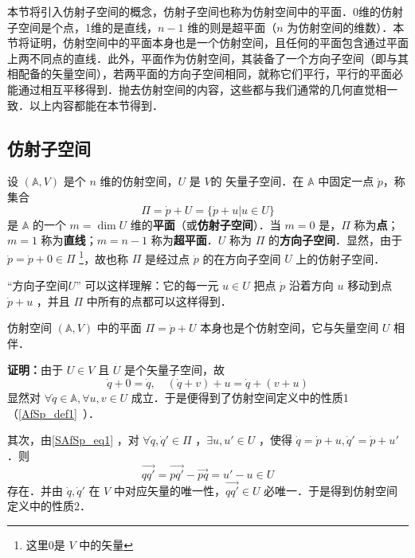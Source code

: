 
\begin{issues}
\end{issues}

本节将引入仿射子空间的概念，仿射子空间也称为仿射空间中的平面．0维的仿射子空间是个点，1维的是直线，$n-1$ 维的则是超平面（$n$ 为仿射空间的维数）．本节将证明，仿射空间中的平面本身也是一个仿射空间，且任何的平面包含通过平面上两不同点的直线．此外，平面作为仿射空间，其装备了一个方向子空间（即与其相配备的矢量空间），若两平面的方向子空间相同，就称它们平行，平行的平面必能通过相互平移得到．抛去仿射空间的内容，这些都与我们通常的几何直觉相一致．以上内容都能在本节得到．
\subsection{仿射子空间}
\begin{definition}{}\label{SAfSp_def1}
设 $(\mathbb A,V)$ 是个 $n$ 维的仿射空间，$U$ 是 $V$的 矢量子空间．在 $\mathbb A$ 中固定一点 $\dot p$，称集合
\begin{equation}\label{SAfSp_eq1}
\Pi=\dot p+U=\{\dot p+u|u\in U\}
\end{equation}
是 $\mathbb A$ 的一个 $m=\dim U$ 维的\textbf{平面}（或\textbf{仿射子空间}）．当 $m=0$ 是，$\Pi$ 称为\textbf{点}；$m=1$ 称为\textbf{直线}；$m=n-1$ 称为\textbf{超平面}．$U$ 称为 $\Pi$ 的\textbf{方向子空间}．显然，由于 $\dot p=\dot p+0\in \Pi$ \footnote{这里0是 $V$ 中的矢量}，故也称 $\Pi$ 是经过点 $\dot p$ 的在方向子空间 $U$ 上的仿射子空间．
\end{definition}
“方向子空间$U$” 可以这样理解：它的每一元 $u\in U$ 把点 $\dot p$ 沿着方向 $u$ 移动到点 $\dot p+u$ ，并且 $\Pi$ 中所有的点都可以这样得到．

\begin{theorem}{}
仿射空间 $(\mathbb A,V)$ 中的平面 $\Pi=\dot p+U$ 本身也是个仿射空间，它与矢量空间 $U$ 相伴．
\end{theorem}
\textbf{证明：}由于 $U\in V$ 且 $U$ 是个矢量子空间，故
\begin{equation}
\dot q+0=\dot q,\quad (\dot q+v)+u=\dot q+(v+u)
\end{equation}
显然对 $\forall \dot q\in\mathbb A,\forall u,v\in U$ 成立．于是便得到了仿射空间定义中的性质1（\autoref{AfSp_def1}~）．

其次，由\autoref{SAfSp_eq1} ，对 $\forall \dot q,\dot q'\in\Pi$ ，$\exists u,u'\in U$ ，使得 $\dot q=\dot p+u,\dot q'=\dot p+u'$．则
\begin{equation}
\overrightarrow{qq'}=\overrightarrow{pq'}-\overrightarrow{pq}=u'-u\in U
\end{equation}
存在．并由 $\dot q,\dot q'$ 在 $V$ 中对应矢量的唯一性，$\overrightarrow{qq'}\in U$ 必唯一．于是得到仿射空间定义中的性质2．

